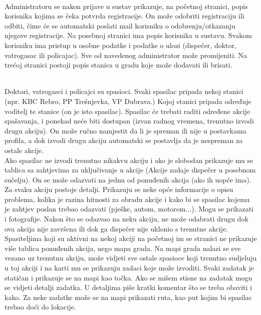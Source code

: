 		\textbf{}\\
		\text Administratoru se nakon prijave u sustav prikazuje, na početnoj stranici, popis korisnika kojima se čeka potvrda registracije. On može odobriti registraciju ili odbiti, čime će se automatski poslati mail korisniku o odobrenju/otkazanju njegove registracije. Na posebnoj stranici ima popis korisnika u sustavu. Svakom korisniku ima pristup u osobne podatke i podatke o ulozi (dispečer, doktor, vatrogasac ili policajac). Sve od navedenog administrator može promijeniti. Na trećoj stranici postoji popis stanica u gradu koje može dodavati ili brisati.
		
		\textbf{}\\
		\text Doktori, vatrogasci i policajci su spasioci. Svaki spasilac pripada nekoj stanici (npr. KBC Rebro, PP Trešnjevka, VP Dubrava.) Kojoj stanici pripada određuje voditelj te stanice (on je isto spasilac). Spasilac će trebati raditi određene akcije spašavanja, i ponekad neće biti dostupan (izvan radnog vremena, trenutno izvodi drugu akciju). On može ručno namjestit da li je spreman ili nije u postavkama profila, a dok izvodi drugu akciju automatski se postavlja da je nespreman za ostale akcije.\\
		Ako spasilac ne izvodi trenutno nikakvu akciju i ako je slobodan prikazuje mu se tablica sa zahtjevima za uključivanje u akcije (Akcije zadaje dispečer u posebnom sučelju). On se može odazvati na jednu od ponuđenih akcija (ako ih uopće ima). Za svaku akciju postoje detalji. Prikazuju se neke opće informacije o opisu problema, kolika je razina hitnosti za obradu akcije i kako bi se spasilac kojemu je zahtjev poslan trebao odazvati (pješke, autom, motorom...). Mogu se prikazati i fotografije. Nakon što se odazvao na neku akciju, ne može odabrati drugu dok ova akcija nije završena ili dok ga dispečer nije uklonio s trenutne akcije.\\
		Spasiteljima koji su aktivni na nekoj akciji na početnoj im se stranici ne prikazuje više tablica ponuđenih akcija, nego mapa grada. Na mapi grada nalazi se sve vezano uz trenutnu akciju, može vidjeti sve ostale spasioce koji trenutno sudjeluju u toj akciji i na karti mu se prikazuju zadaci koje može izvoditi. Svaki zadatak je statičan i prikazuje se na mapi kao točka. Ako se mišem stisne na zadatak mogu se vidjeti detalji zadatka. U detaljima piše kratki komentar što se treba obaviti i kako. Za neke zadatke može se na mapi prikazati ruta, kao put kojim bi spasilac trebao doći do lokacije.
		

